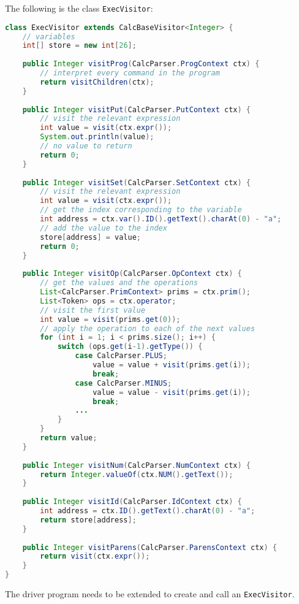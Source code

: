 \documentclass[a4paper, openany]{memoir}
\begin{document}
The following is the class \texttt{ExecVisitor}:
\begin{lstlisting}[language=java]
class ExecVisitor extends CalcBaseVisitor<Integer> {
    // variables
    int[] store = new int[26];
    
    public Integer visitProg(CalcParser.ProgContext ctx) {
        // interpret every command in the program
        return visitChildren(ctx);
    }
    
    public Integer visitPut(CalcParser.PutContext ctx) {
        // visit the relevant expression
        int value = visit(ctx.expr());
        System.out.println(value);
        // no value to return
        return 0;
    }
    
    public Integer visitSet(CalcParser.SetContext ctx) {
        // visit the relevant expression
        int value = visit(ctx.expr());
        // get the index corresponding to the variable
        int address = ctx.var().ID().getText().charAt(0) - "a";
        // add the value to the index
        store[address] = value;
        return 0;
    }
    
    public Integer visitOp(CalcParser.OpContext ctx) {
        // get the values and the operations
        List<CalcParser.PrimContext> prims = ctx.prim();
        List<Token> ops = ctx.operator;
        // visit the first value
        int value = visit(prims.get(0));
        // apply the operation to each of the next values
        for (int i = 1; i < prims.size(); i++) {
            switch (ops.get(i-1).getType()) {
                case CalcParser.PLUS;
                    value = value + visit(prims.get(i));
                    break;
                case CalcParser.MINUS;
                    value = value - visit(prims.get(i));
                    break;
                ...
            }
        }
        return value;
    }
    
    public Integer visitNum(CalcParser.NumContext ctx) {
        return Integer.valueOf(ctx.NUM().getText());
    }
    
    public Integer visitId(CalcParser.IdContext ctx) {
        int address = ctx.ID().getText().charAt(0) - "a";
        return store[address];
    }
    
    public Integer visitParens(CalcParser.ParensContext ctx) {
        return visit(ctx.expr());
    }
}
\end{lstlisting}

The driver program needs to be extended to create and call an \texttt{ExecVisitor}.
\end{document}
